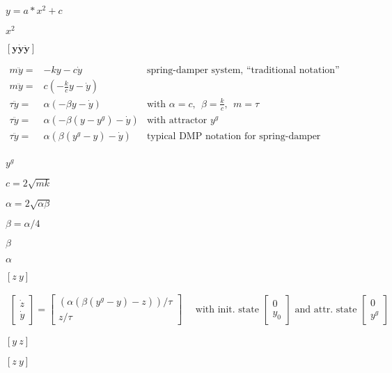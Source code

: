\documentclass{article}
\begin{document}
$ y = a*x^2 + c $
\pagebreak

$ x^2 $
\pagebreak

$ [\mathbf{y \dot{y} \ddot{y}} ]$
\pagebreak

\begin{eqnarray*} m\ddot{y} =& -ky -c\dot{y} & \mbox{spring-damper system, ``traditional notation''} \\ m\ddot{y} =& c(-\frac{k}{c}y - \dot{y})\\ \tau\ddot{y} =& \alpha(-\beta y - \dot{y}) & \mbox{with } \alpha=c,~~\beta = \frac{k}{c},~~m=\tau\\ \tau\ddot{y} =& \alpha(-\beta (y-y^g) - \dot{y})& \mbox{with attractor } y^g\\ \tau\ddot{y} =& \alpha(\beta (y^g-y) - \dot{y})& \mbox{typical DMP notation for spring-damper system}\\ \end{eqnarray*}
\pagebreak

$y^g$
\pagebreak

$c = 2\sqrt{mk}$
\pagebreak

$\alpha = 2\sqrt{\alpha\beta}$
\pagebreak

$\beta = \alpha/4$
\pagebreak

$\beta$
\pagebreak

$\alpha$
\pagebreak

$ [z~y]$
\pagebreak

\begin{eqnarray*} \left[ \begin{array}{l} {\dot{z}} \\ {\dot{y}} \end{array} \right] = \left[ \begin{array}{l} (\alpha (\beta({y}^{g}-{y})-{z}))/\tau \\ {z}/\tau \end{array} \right] \mbox{~~~~with init. state~} \left[ \begin{array}{l} 0 \\ y_0 \end{array} \right] \mbox{~and attr. state~} \left[ \begin{array}{l} {0} \\ {y}^g \end{array} \right] \end{eqnarray*}
\pagebreak

$ [y~z]$
\pagebreak

$[z~y]$
\pagebreak
\end{document}
